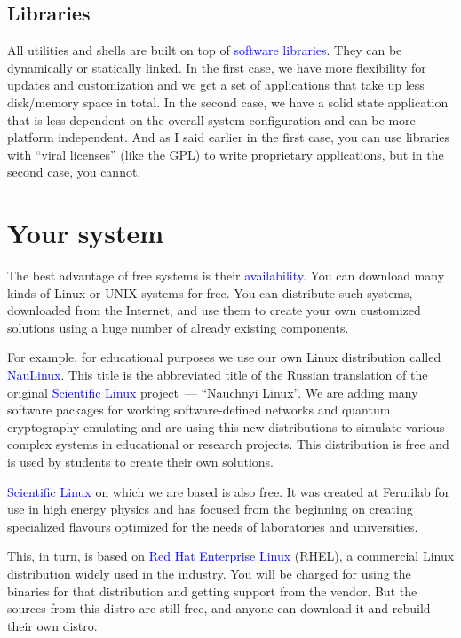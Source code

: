 \documentclass[12pt]{report}
\newcommand{\struct}[1]{\textcolor{blue}{#1}}
\begin{document}
\subsection*{Libraries}

All utilities and shells are built on top of \struct{software libraries}.
They can be dynamically or statically linked. In the first case,
we have more flexibility for updates and customization and we get a set of
applications that take up less disk/memory space in total.
In the second case, we have a solid state application that is less dependent on
the overall system configuration and can be more platform independent.
And as I said earlier in the first case, you can use libraries with ``viral
licenses'' (like the GPL) to write proprietary applications, but in
the second case, you cannot.

\section*{Your system}

The best advantage of free systems is their \struct{availability}.
You can download many kinds of Linux or UNIX systems for free.
You can distribute such systems, downloaded from the Internet,
and use them to create your own customized solutions using a huge number of
already existing components.

\medskip
For example, for educational purposes we use our own Linux distribution
called \struct{NauLinux}. This title is the abbreviated title of the Russian
translation of the original \struct{Scientific Linux} project~---
``Nauchnyi Linux''. We are adding many software packages for working
software-defined networks and quantum cryptography emulating and are using
this new distributions to simulate various complex systems in educational or
research projects. This distribution is free and is used by students to
create their own solutions.

\medskip
\struct{Scientific Linux} on which we are based is also free. It was created at
Fermilab for use in high energy physics and has focused from the beginning on
creating specialized flavours optimized for the needs of laboratories and
universities.

\medskip
This, in turn, is based on \struct{Red Hat Enterprise Linux} (RHEL),
a commercial Linux distribution widely used in the industry.
You will be charged for using the binaries for that distribution and
getting support from the vendor. But the sources from this distro are still
free, and anyone can download it and rebuild their own distro.
\end{document}
